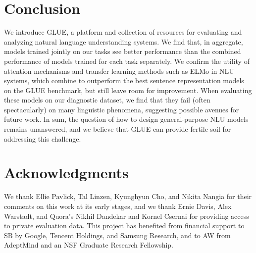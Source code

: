 \documentclass{article} \usepackage{iclr2019_conference,times}
\begin{document}
\section{Conclusion}\label{sec:conclusion}

We introduce GLUE, 
a platform and collection of resources for evaluating and analyzing natural language understanding systems. 
We find that, in aggregate, models trained jointly on our tasks see better performance than the combined performance of models trained for each task separately.
We confirm the utility of attention mechanisms and transfer learning methods such as ELMo in NLU systems, which combine to outperform the best sentence representation models on the GLUE benchmark, but still leave room for improvement.
When evaluating these models on our diagnostic dataset, we find that they fail (often spectacularly) on many linguistic phenomena, suggesting possible avenues for future work.
In sum, the question of how to design general-purpose NLU models remains unanswered, and we believe that GLUE can provide fertile soil for addressing this challenge.

\section*{Acknowledgments}
We thank Ellie Pavlick, Tal Linzen, Kyunghyun Cho, and Nikita Nangia for their comments on this work at its early stages, and we thank Ernie Davis, Alex Warstadt, and Quora's Nikhil Dandekar and Kornel Csernai for providing access to private evaluation data. 
This project has benefited from financial support to SB by Google, Tencent Holdings, and Samsung Research, and to AW from AdeptMind and an NSF Graduate Research Fellowship. 




\appendix
\end{document}
